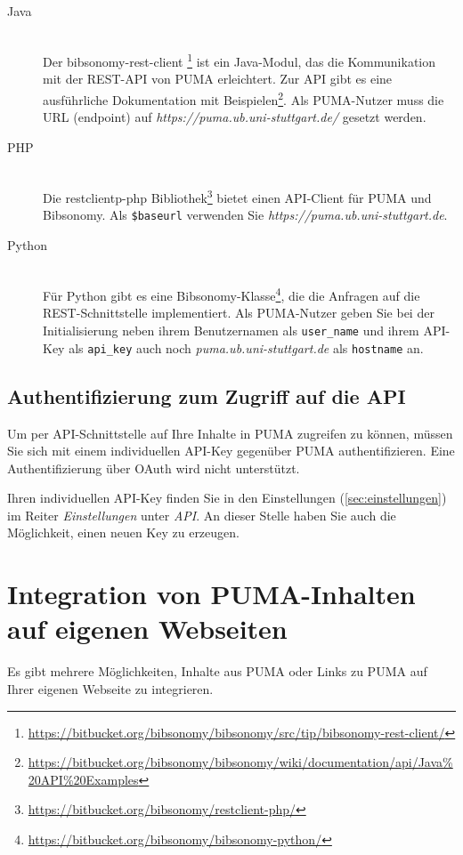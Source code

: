 \begin{description}
\item [Java] \hfill \\
  Der bibsonomy-rest-client \footnote{\url{https://bitbucket.org/bibsonomy/bibsonomy/src/tip/bibsonomy-rest-client/}} ist ein Java-Modul, das die Kommunikation mit der REST-API von PUMA erleichtert. Zur API gibt es eine ausführliche Dokumentation mit Beispielen\footnote{\url{https://bitbucket.org/bibsonomy/bibsonomy/wiki/documentation/api/Java\%20API\%20Examples}}. Als PUMA-Nutzer muss die URL (endpoint) auf \textit{https://puma.ub.uni-stuttgart.de/} gesetzt werden.
\item [PHP] \hfill \\
  Die restclientp-php Bibliothek\footnote{\url{https://bitbucket.org/bibsonomy/restclient-php/}} bietet einen API-Client für PUMA und Bibsonomy. Als \texttt{\$baseurl} verwenden Sie \textit{https://puma.ub.uni-stuttgart.de}.
\item [Python] \hfill \\
 Für Python gibt es eine Bibsonomy-Klasse\footnote{\url{https://bitbucket.org/bibsonomy/bibsonomy-python/}}, die die Anfragen auf die REST-Schnittstelle implementiert. Als PUMA-Nutzer geben Sie bei der Initialisierung neben ihrem Benutzernamen als \texttt{user\_name} und ihrem API-Key als \texttt{api\_key} auch noch \textit{puma.ub.uni-stuttgart.de} als \texttt{hostname} an.

\end{description}

\subsection{Authentifizierung zum Zugriff auf die API}
\label{subsec:apiAuth}\label{sss:apiKey}

Um per API-Schnittstelle auf Ihre Inhalte in PUMA zugreifen zu können, müssen Sie sich  mit einem individuellen API-Key gegenüber PUMA authentifizieren. Eine Authentifizierung über OAuth wird nicht unterstützt.

Ihren individuellen API-Key finden Sie in den Einstellungen (\autoref{sec:einstellungen}) im Reiter \textit{Einstellungen} unter \textit{API}. An dieser Stelle haben Sie auch die Möglichkeit, einen neuen Key zu erzeugen. 

\section{Integration von PUMA-Inhalten auf eigenen Webseiten}
\label{sec:eigeneWebseiten}
Es gibt mehrere Möglichkeiten, Inhalte aus PUMA oder Links zu PUMA auf Ihrer eigenen Webseite zu integrieren.


